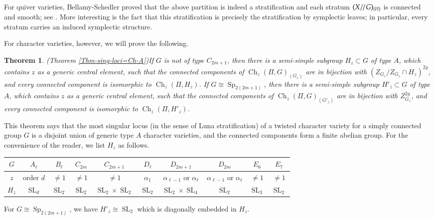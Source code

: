 \documentclass[11pt,oneside,dvipsnames]{amsart}
\theoremstyle{plain}
\newtheorem{ThmA}{Theorem}
\theoremstyle{definition}
\theoremstyle{named}
\DeclareMathOperator{\Ch}{Ch}
\DeclareMathOperator{\SL}{SL}
\DeclareMathOperator{\Sp}{Sp}
\DeclareMathOperator{\ds}{\!/\mkern-2mu/\mkern-2mu}
\begin{document}
For quiver varieties, Bellamy-Schedler proved that the above partition is indeed a stratification and each stratum $(X\ds G)_{(H)}$ is connected and smooth; see \cite[Theorem 3.14 and Proposition 3.15]{BS0}. More interesting is the fact that this stratification is precisely the stratification by symplectic leaves; in particular, every stratum carries an induced symplectic structure.

For character varieties, however, we will prove the following.
\begin{ThmA}(Theorem \ref{Thm-sing-loci=Ch-A})\label{Thm-B}
If $G$ is not of type $C_{2m+1}$, then there is a semi-simple subgroup $H_z\subset G$ of type $A$, which contains $z$ as a generic central element, such that the connected components of $\Ch_z(\Pi,G)_{(G_z)}$ are in bijection with $(Z_{G_z}/Z_{G_z}\cap H_z)^{2g}$, and every connected component is isomorphic to $\Ch_z(\Pi,H_z)$. If $G\cong\Sp_{2(2m+1)}$, then there is a semi-simple subgroup $H'_z\subset G$ of type $A$, which contains $z$ as a generic central element, such that the connected components of $\Ch_z(\Pi,G)_{(G'_z)}$ are in bijection with $Z_{G_z}^{2g}$, and every connected component is isomorphic to $\Ch_z(\Pi,H'_z)$.
\end{ThmA}

This theorem says that the most singular locus (in the sense of Luna stratification) of a twisted character variety for a simply connected group $G$ is a disjoint union of generic type $A$ character varieties, and the connected components form a finite abelian group. For the convenience of the reader, we list $H_z$ as follows.
\begin{center}
\begin{tabular}{|c|c|c|c|c|c|c|c|c|c|}
\hline
$G$ & $A_{\ell}$ & $B_{\ell}$ & $C_{2m}$ & $C_{2m+1}$ & $D_{\ell}$ & $D_{2m+1}$ & $D_{2m}$ & $E_6$ & $E_7$ \\
\hline
$z$ & order $d$ & $\ne 1$ & $\ne 1$ & $\ne1$ & $\alpha_1$ & $\alpha_{\ell-1}$ or $\alpha_{\ell}$ & $\alpha_{\ell-1}$ or $\alpha_{\ell}$ & $\ne1$ & $\ne1$ \\ 
\hline
$H_z$ & $\SL_d$ & $\SL_2$ & $\SL_2$ & $\SL_2\times\SL_2$ & $\SL_2$ & $\SL_2\times\SL_4$ & $\SL_2$ & $\SL_3$ & $\SL_2$ \\
\hline
\end{tabular}
\end{center}
For $G\cong\Sp_{2(2m+1)}$, we have $H'_z\cong\SL_2$ which is diagonally embedded in $H_z$.
\end{document}

